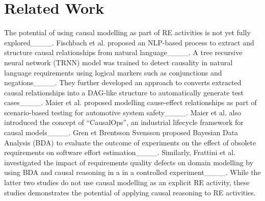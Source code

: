 \section{Related Work}
The potential of using causal modelling as part of RE activities is not yet fully explored____. Fischbach et al. proposed an NLP-based process to extract and structure causal relationships from natural language____. A tree recursive neural network (TRNN) model was trained to detect causality in natural language requirements using logical markers such as conjunctions and negations____. They further developed an approach to converts extracted causal relationships into a DAG-like structure to automatically generate test cases____.
Maier et al. proposed modelling cause-effect relationships as part of scenario-based testing for automotive system safety____. Maier et al. also introduced the concept of ``CausalOps'', an industrial lifecycle framework for causal models____.
Gren et Brentsson Svensson proposed Bayesian Data Analysis (BDA) to evaluate the outcome of experiments on the effect of obsolete requirements on software effort estimation____. Similarly, Frattini et al. investigated the impact of requirements quality defects on domain modelling by using BDA and causal reasoning in a in a controlled experiment____. While the latter two studies do not use causal modelling as an explicit RE activity, these studies demonstrates the potential of applying causal reasoning to RE activities.